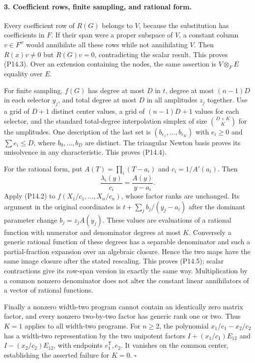 \paragraph{3. Coefficient rows, finite sampling, and rational form.}
Every coefficient row of $R(G)$ belongs to $V$, because the
substitution has coefficients in $F$. If their span were a
proper subspace of $V$, a constant column $v\in F^w$ would
annihilate all these rows while not annihilating $V$. Then
$R(x)v\ne0$ but $R(G)v=0$, contradicting the scalar result.
This proves (P14.3). Over an extension containing the nodes,
the same assertion is $V\otimes_F E$ equality over $E$.

For finite sampling, $f(G)$ has degree at most $D$ in $t$,
degree at most $(n-1)D$ in each selector $y_j$, and total degree
at most $D$ in all amplitudes $z_j$ together. Use a grid of
$D+1$ distinct center values, a grid of $(n-1)D+1$ values for
each selector, and the standard total-degree interpolation
simplex of size $\binom{D+K}{K}$ for the amplitudes. One
description of the last set is
$(b_{e_1},\ldots,b_{e_K})$ with $e_i\geq0$ and
$\sum e_i\leq D$, where $b_0,\ldots,b_D$ are distinct.
The triangular Newton basis proves its unisolvence in any
characteristic. This proves (P14.4).

For the rational form, put $A(T)=\prod_i(T-a_i)$ and
$c_i=1/A'(a_i)$. Then
\[
 \frac{\lambda_i(y)}{c_i}=\frac{A(y)}{y-a_i}.
 \tag{P14.11}
\]
Apply (P14.2) to $f(X_1/c_1,\ldots,X_n/c_n)$, whose factor
ranks are unchanged. Its argument in the original coordinates
is $t+\sum_j b_j/(y_j-a_i)$ after the dominant parameter
change $b_j=z_jA(y_j)$. These values are evaluations of a
rational function with numerator and denominator degrees at
most $K$. Conversely a generic rational function of these
degrees has a separable denominator and such a partial-fraction
expansion over an algebraic closure. Hence the two maps have
the same image closure after the stated rescaling. This
proves (P14.5); scalar contractions give its row-span version
in exactly the same way. Multiplication by a common nonzero
denominator does not alter the constant linear annihilators
of a vector of rational functions.

Finally a nonzero width-two program cannot contain an
identically zero matrix factor, and every nonzero two-by-two
factor has generic rank one or two. Thus $K=1$ applies to
all width-two programs. For $n\geq2$, the polynomial
$x_1/c_1-x_2/c_2$ has a width-two representation by the two
unipotent factors $I+(x_1/c_1)E_{12}$ and
$I-(x_2/c_2)E_{12}$, with endpoints $e_1^{\mathsf T},e_2$.
It vanishes on the common center, establishing the asserted
failure for $K=0$. $\square$

